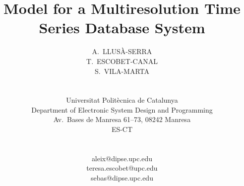 \documentclass[twocolumn,11pt,a4paper]{article}
\begin{document}
\global\def\refname{{\normalsize \it References:}}
%
\baselineskip 12.5pt
%
%
%
\title{\LARGE \bf Model for a Multiresolution Time Series
  Database System}

\date{}

\author{\hspace*{-10pt}
\begin{minipage}[t]{2.3in} \normalsize \baselineskip 12.5pt
\centerline{A.\ LLUSÀ-SERRA}
\end{minipage} \kern 0in
\begin{minipage}[t]{2.3in} \normalsize \baselineskip 12.5pt
\centerline{T.\ ESCOBET-CANAL}
\end{minipage} \kern 0in
\begin{minipage}[t]{2.3in} \normalsize \baselineskip 12.5pt
\centerline{S.\ VILA-MARTA}
\end{minipage} \\ \hspace*{-10pt}
%
\begin{minipage}[t]{2.7in} \normalsize \baselineskip 12.5pt
\centerline{Universitat Politècnica de Catalunya}
\centerline{Department of Electronic System Design and Programming}
\centerline{Av.\ Bases de Manresa 61--73, 08242 Manresa}
\centerline{ES-CT}
\end{minipage} \\ \hspace*{-10pt}
%
\begin{minipage}[t]{2.3in} \normalsize \baselineskip 12.5pt
\centerline{aleix@dipse.upc.edu}
\end{minipage} \kern 0in
\begin{minipage}[t]{2.3in} \normalsize \baselineskip 12.5pt
\centerline{teresa.escobet@upc.edu}
\end{minipage} \kern 0in
\begin{minipage}[t]{2.3in} \normalsize \baselineskip 12.5pt
\centerline{sebas@dipse.upc.edu}
\end{minipage} 
%
\\ \\ \hspace*{-10pt}
\begin{minipage}[b]{6.9in} \normalsize

\end{minipage}}
\end{document}
